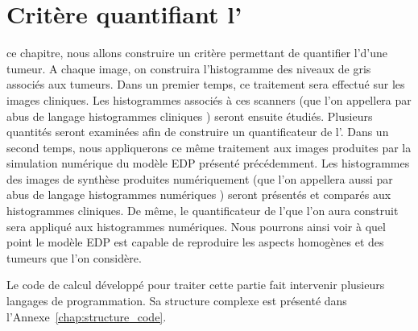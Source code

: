 \documentclass[main.tex]{subfiles}
\begin{document}



\chapter{Critère quantifiant l'\hetero \label{chap:crit_hetero}}
 ce chapitre, nous allons construire un critère permettant de quantifier l'\hetero d'une tumeur.
A chaque image, on construira l'histogramme des niveaux de gris associés aux tumeurs. 
Dans un premier temps, ce traitement sera effectué sur les images cliniques. %
Les histogrammes associés à ces scanners (que l'on appellera par abus de langage \og histogrammes cliniques \fg) seront ensuite étudiés. Plusieurs quantités seront examinées afin de construire un quantificateur de l'\hetero.
Dans un second temps, nous appliquerons ce même traitement aux images produites par la simulation numérique du modèle EDP présenté précédemment. Les histogrammes des images de synthèse produites numériquement (que l'on appellera aussi par abus de langage \og histogrammes numériques \fg) seront présentés et comparés aux histogrammes cliniques. De même, le quantificateur de l'\hetero que l'on aura construit sera appliqué aux histogrammes numériques. Nous pourrons ainsi voir à quel point le modèle EDP est capable de reproduire les aspects homogènes et \heterogenes des tumeurs que l'on considère.


Le code de calcul développé pour traiter cette partie fait intervenir plusieurs langages de programmation. Sa structure complexe est présenté dans l'Annexe~\ref{chap:structure_code}. 
\end{document}
